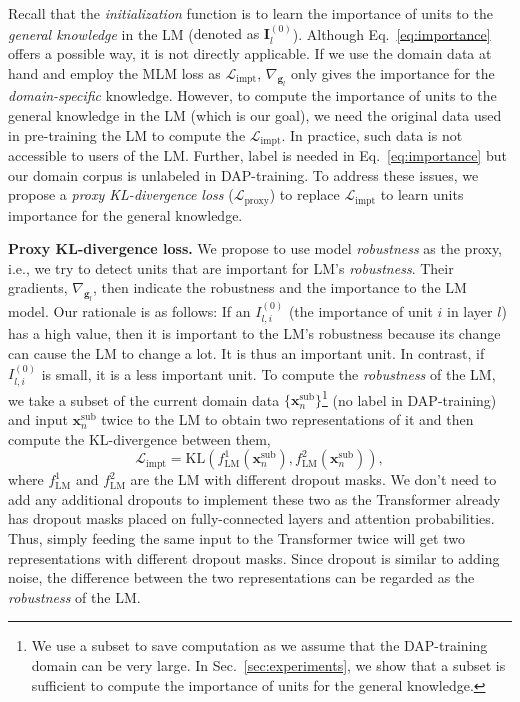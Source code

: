 \documentclass{article} \usepackage{iclr2023_conference,times}
\begin{document}
Recall that the \textit{initialization} function is to learn the importance of units to the \textit{general knowledge} in the LM ({\color{black}denoted as $\bm{I}_l^{(0)}$}). Although Eq.~\ref{eq:importance} offers a possible way, it is not directly applicable. If we use the domain data at hand and employ the MLM loss as $\mathcal{L}_{\text{impt}}$, $\nabla_{\bm{g}_{l}}$ only gives the importance for the \textit{domain-specific} knowledge. However, to compute the importance of units to the general knowledge in the LM (which is our goal), we need the original data used in pre-training the LM to compute the $\mathcal{L}_{\text{impt}}$. In practice, such data is not accessible to users of the LM. Further, label is needed in Eq.~\ref{eq:importance} but our domain corpus is unlabeled in DAP-training.
To address these issues, we propose a \textit{proxy KL-divergence loss} ($\mathcal{L}_{\text{proxy}}$) to replace $\mathcal{L}_{\text{impt}}$ to learn units importance for the general knowledge.


\textbf{Proxy KL-divergence loss.} 
We propose to use model \textit{robustness} as the proxy, i.e., we try to detect units that are important for LM's \textit{robustness}. Their gradients, $\nabla_{\bm{g}_{l}}$, then indicate the robustness and the importance to the LM model. Our rationale is as follows: If an $I_{l,i}^{(0)}$ (the importance of unit $i$ in layer $l$) has a high value, then it is important to the LM's robustness because its change can cause the LM to change a lot. It is thus an important unit. In contrast, if $I_{l,i}^{(0)}$ is small, it is a less important unit.
To compute the \textit{robustness} of the LM, we take a subset of the current domain data $\{\bm{x}^{\text{sub}}_n\}$\footnote{{\color{black}We use a subset to save computation as we assume that the DAP-training domain can be very large. In Sec.~\ref{sec:experiments}, we show that a subset is sufficient to compute the importance of units for the general knowledge.}} (no label in DAP-training)
and input $\bm{x}^{\text{sub}}_n$ twice to the LM  {\color{black}to obtain two representations of it and then compute the KL-divergence between them}, \begin{equation}
\mathcal{L}_{\text{impt}} = \text{KL}(f^1_{\text{LM}}(\bm{x}^{\text{sub}}_n),f^2_{\text{LM}}(\bm{x}^{\text{sub}}_n)),
\label{eq:proxy}
\end{equation}
where $f_{\text{LM}}^1$ and $f_{\text{LM}}^2$ are the LM with different dropout masks. We don't need to add any additional dropouts to implement these two as 
the Transformer already has dropout masks placed on fully-connected layers and attention probabilities. Thus, simply feeding the same input to the Transformer twice will get two representations with different dropout masks. Since dropout is similar to adding noise, the difference between the two representations can be regarded as the \textit{robustness} of the LM. 
\end{document}
